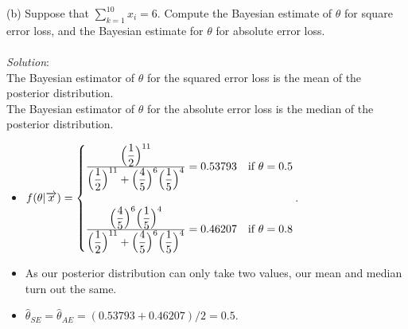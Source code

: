 \documentclass[12pt]{article}
\newcommand{\ds}{\displaystyle}
\begin{document}
\newpage

\vspace{2.5mm}

(b) Suppose that $ \sum_{k=1}^{10} x_{i} = 6 $. Compute the Bayesian estimate of $ \theta $ for square error loss, and the Bayesian estimate for $ \theta $ for absolute error loss. \\
\vspace{2.5mm} \\
\textit{Solution}:
\vspace{2.5mm} \\ 

\noindent
The Bayesian estimator of $ \theta $ for the squared error loss is the mean of the posterior distribution. \\
\noindent
The Bayesian estimator of $ \theta $ for the absolute error loss is the median of the posterior distribution. \\

\begin{itemize} 
    \item $ \ds f(\theta | \overrightarrow{x}) = \begin{cases} 
        \frac{ \ds \Bigl( \frac{1}{2} \Bigr)^{11} }{ \ds \Bigl( \frac{1}{2} \Bigr)^{11} + \Bigl( \frac{4}{5} \Bigr)^{6} \Bigl( \frac{1}{5} \Bigr)^{4} } = 
        0.53793 & \text{if} \ \theta = 0.5 \\
        \ & \ \\
        \frac{ \ds \Bigl( \frac{4}{5} \Bigr)^{6} \Bigl( \frac{1}{5} \Bigr)^{4} }{ \ds \Bigl( \frac{1}{2} \Bigr)^{11} + \Bigl( \frac{4}{5} \Bigr)^{6} \Bigl( \frac{1}{5} \Bigr)^{4} } = 
        0.46207 & \text{if} \ \theta = 0.8
    \end{cases} $. \\ 
    \item As our posterior distribution can only take two values, our mean and median turn out the same.
    \item $ \ds \hat{\theta}_{SE} = \hat{\theta}_{AE} = (0.53793 + 0.46207) / 2 = 0.5 $.
\end{itemize}

\vspace{2.5mm}
\end{document}

